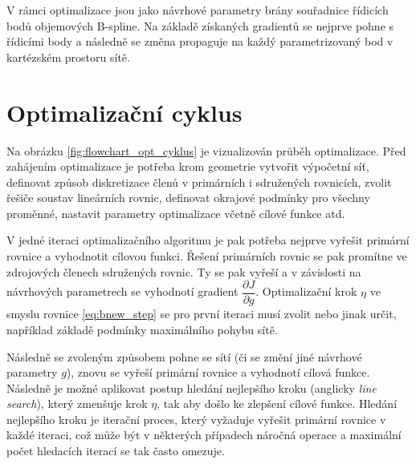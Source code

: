 V rámci optimalizace jsou jako návrhové parametry brány souřadnice řídicích bodů objemových B-spline. Na základě získaných gradientů se nejprve pohne s řídicími body a následně se změna propaguje na každý parametrizovaný bod v kartézském prostoru sítě.


\newpage
\section{Optimalizační cyklus}

Na obrázku \ref{fig:flowchart_opt_cyklus} je vizualizován průběh optimalizace. Před zahájením optimalizace je potřeba krom geometrie vytvořit výpočetní síť, definovat způsob diskretizace členů v primárních i sdružených rovnicích, zvolit řešiče soustav lineárních rovnic, definovat okrajové podmínky pro všechny proměnné, nastavit parametry optimalizace včetně cílové funkce atd. 

V jedné iteraci optimalizačního algoritmu je pak potřeba nejprve vyřešit primární rovnice a vyhodnotit cílovou funkci. Řešení primárních rovnic se pak promítne ve zdrojových členech sdružených rovnic. Ty se pak vyřeší a v závislosti na návrhových parametrech se vyhodnotí gradient $ \dfrac{\partial J}{\partial g} $. Optimalizační krok $ \eta $ ve smyslu rovnice \ref{eq:bnew_step} se pro první iteraci musí zvolit nebo jinak určit, například základě podmínky maximálního pohybu sítě.

Následně se zvoleným způsobem pohne se sítí (či se změní jiné návrhové parametry $ g $), znovu se vyřeší primární rovnice a vyhodnotí cílová funkce. Následně je možné aplikovat postup hledání nejlepšího kroku (anglicky \textit{line search}), který zmenšuje krok $ \eta $, tak aby došlo ke zlepšení cílové funkce. Hledání nejlepšího kroku je iterační proces, který vyžaduje vyřešit primární rovnice v každé iteraci, což může být v některých případech náročná operace a maximální počet hledacích iterací se tak často omezuje.

